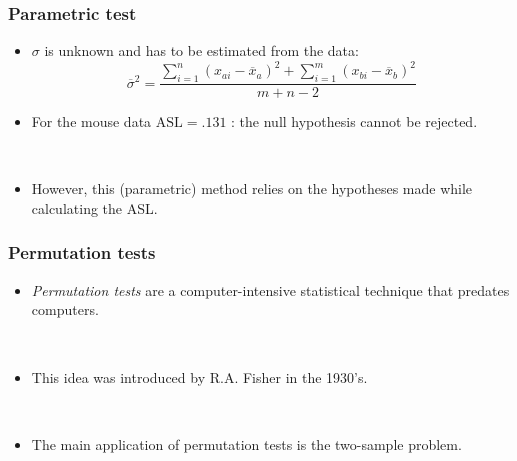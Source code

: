 {
\frametitle{Parametric test}

\begin{itemize}
\item $\sigma$ is unknown and has to be estimated from the data:
$$ 
\overline{\sigma}^2= \frac{\sum_{i=1}^{n} (x_{ai}-\overline{x}_{a})^2 +\sum_{i=1}^{m} (x_{bi}-\overline{x}_{b})^2} {m+n-2}
$$



\item For the mouse data $\mathrm{ASL}=.131$ : the null hypothesis cannot be rejected.

\

\item However, this (parametric) method relies on the hypotheses made while calculating the ASL.  

\end{itemize} 

}
\frame
{
\frametitle{Permutation tests}

\begin{itemize}
\item \textit{Permutation tests} are a computer-intensive statistical technique that predates computers. 

\ 

\item This idea was introduced by R.A. Fisher in the 1930's.

\

\item The main application of permutation tests is the two-sample problem. 

\end{itemize}
}




